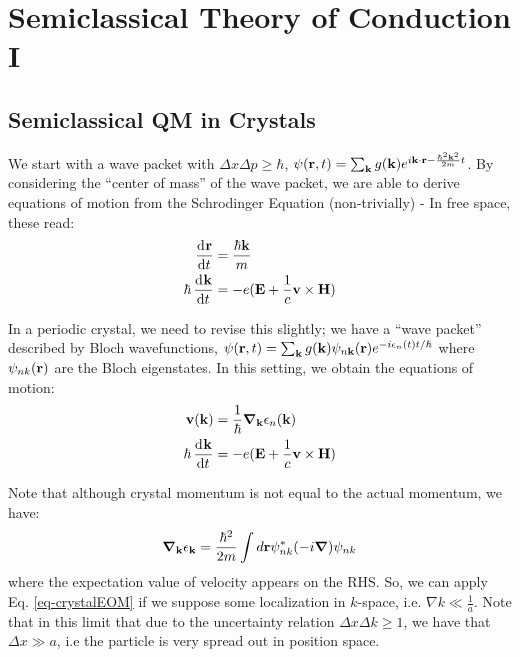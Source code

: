 \section{Semiclassical Theory of Conduction I}

\subsection{Semiclassical QM in Crystals}
We start with a wave packet with $\Delta x \Delta p \geq \hbar$, $\psi(\mathbf{r}, t) = \sum_{\mathbf{k}} g(\mathbf{k})e^{i\mathbf{k} \cdot \mathbf{r} - \frac{\hbar^2 \mathbf{k}^2}{2m}t}$. By considering the ``center of mass'' of the wave packet, we are able to derive equations of motion from the Schrodinger Equation (non-trivially) - In free space, these read:
\begin{equation}
    \begin{split}
        \dod{\v{r}}{t} &= \frac{\hbar \v{k}}{m}
        \\ \hbar \dod{\v{k}}{t} &= -e(\v{E} + \frac{1}{c}\v{v} \times \v{H})
    \end{split}
\end{equation}

In a periodic crystal, we need to revise this slightly; we have a ``wave packet'' described by Bloch wavefunctions, $\psi(\mathbf{r}, t) = \sum_{\mathbf{k}}g(\mathbf{k})\psi_{n\mathbf{k}}(\mathbf{r})e^{-i\epsilon_n(t)t/\hbar}$ where $\psi_{nk}(\mathbf{r})$ are the Bloch eigenstates. In this setting, we obtain the equations of motion:
\begin{equation}\label{eq-crystalEOM}
    \begin{split}
        \v{v}(\v{k}) &= \frac{1}{\hbar}\nabla_\v{k} \e_n(\v{k})
        \\ \hbar\dod{\v{k}}{t} &= -e(\v{E} + \frac{1}{c}\v{v}\times \v{H}) 
    \end{split}
\end{equation}

Note that although crystal momentum is not equal to the actual momentum, we have:
\begin{equation}
    \nabla_\v{k} \e_\v{k} = \frac{\hbar^2}{2m} \int d\v{r} \psi_{nk}^* (-i\nabla)\psi_{nk}
\end{equation}
where the expectation value of velocity appears on the RHS. So, we can apply Eq. \eqref{eq-crystalEOM} if we suppose some localization in $k$-space, i.e. $\nabla k \ll \frac{1}{a}$. Note that in this limit that due to the uncertainty relation $\Delta x \Delta k \geq 1$, we have that $\Delta x \gg a$, i.e the particle is very spread out in position space.

